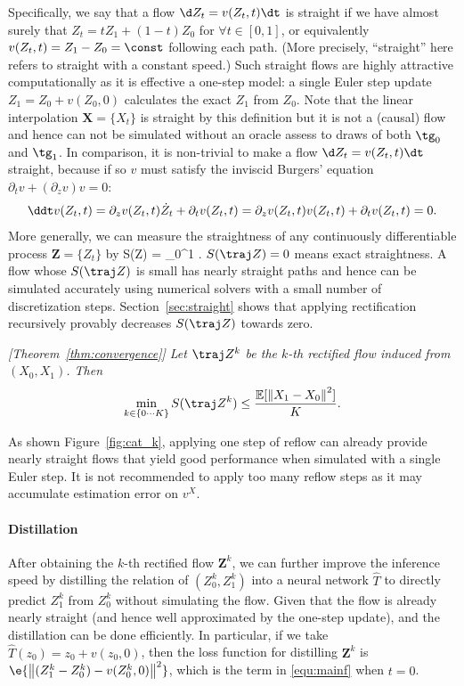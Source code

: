 \documentclass[11pt]{article}
\newcommand{\E}{\mathbb{E}}
\newcommand{\vv}[1]{\boldsymbol{#1}}
\newcommand{\norm}[1]{\left\|#1\right\|}
\begin{document}
Specifically, 
we say that a flow $\d Z_t = v(Z_t, t)\dt$ %
is straight if we have almost surely that $Z_t = t Z_1 + (1-t) Z_0$ for $\forall t\in[0,1]$, 
or equivalently $v(Z_t,t)=Z_1-Z_0=\const$ following each path. 
(More precisely, ``straight'' here refers to  straight with a constant speed.) 
Such straight flows are highly attractive computationally 
as it is effective a one-step model: 
 a single Euler step update $Z_1 = Z_0 + v(Z_0,0)$ calculates the exact $Z_1$ from $Z_0$. %
 Note that the linear interpolation $\vv X= \{X_t\}$ is straight by this definition but it is not a (causal) flow and hence can not be simulated without an oracle assess to draws of both  $\tg_0$ and $\tg_1$.  
 In comparison, it is non-trivial 
to make a flow $\d Z_t = v(Z_t,t)\dt$  straight, because if so $v$ must satisfy the inviscid Burgers' equation $\partial_t v + (\partial_z v) v = 0$: %
$$
\ddt v(Z_t,t)
= \partial_z v(Z_t, t)  \dot Z_t + \partial_t v(Z_t,t) = 
\partial_z v(Z_t, t)  v(Z_t,t) + \partial_t v(Z_t,t) = 0. 
$$
More generally, 
we can measure the straightness of any 
continuously differentiable process $\vv Z=\{Z_t\}$ by %
\bbb \label{equ:straight}
S(\traj Z) = \int_0^1 \e{\norm{(Z_1-Z_0) -\dot Z_t}^2} \dt.
\eee 
$S(\traj Z) = 0$ means exact straightness. 
A flow whose $S(\traj Z)$  is small 
has nearly straight  paths and hence can be simulated accurately using numerical solvers with a small number of discretization steps.  %
Section~\ref{sec:straight} shows that 
applying rectification recursively 
provably decreases 
 $S(\traj Z)$ towards zero. %

 

\emph{[Theorem~\ref{thm:convergence}] 
Let $\traj Z^k $ be the  $k$-th rectified flow %
induced from $(X_0,X_1)$. 
Then %
$$
\min_{k\in\{0\cdots K\}} S(\traj Z^k) \leq \frac{\E[\norm{X_1-X_0}^2]}{K}.  
$$
} 






As shown Figure~\ref{fig:cat_k}, 
applying one step of reflow %
can already provide nearly straight flows that yield good performance when simulated with a single Euler step.  
It is not recommended to apply 
too  many reflow steps as it may accumulate  estimation error on $v^X$. 











\paragraph{Distillation} 
After obtaining the $k$-th rectified flow $\vv Z^k$, we can further improve the inference speed by distilling the relation of $(Z_0^k, Z_1^k)$ into a neural network $\hat T$ to directly predict  $Z_1^k $ from $Z_0^k$ without simulating the flow. 
Given that the flow is already nearly straight (and hence well approximated by the one-step update), 
and  the distillation can be done efficiently. 
In particular, if we take $\hat T(z_0) = z_0 + v(z_0, 0)$, 
then the loss function for distilling $\vv Z^k$ is $\e{\norm{(Z_1^k - Z_0^k) - v(Z_0^k, 0)}^2}$, which is the term in \eqref{equ:mainf} when $t =0$.   %
\end{document}
